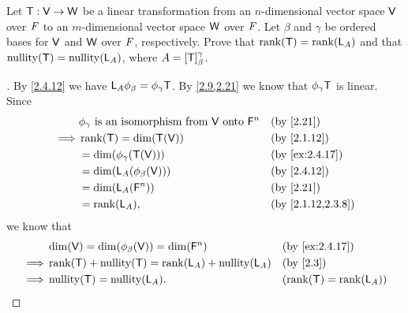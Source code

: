 \setcounter{ex}{19}
\begin{ex}\label{ex:2.4.20}
  Let \(\mathsf{T} : \mathsf{V} \to \mathsf{W}\) be a linear transformation from an \(n\)-dimensional vector space \(\mathsf{V}\) over \(\mathit{F}\) to an \(m\)-dimensional vector space \(\mathsf{W}\) over \(\mathit{F}\).
  Let \(\beta\) and \(\gamma\) be ordered bases for \(\mathsf{V}\) and \(\mathsf{W}\) over \(\mathit{F}\), respectively.
  Prove that \(\rk{\T} = \rk{\L_A}\) and that \(\nt{\T} = \nt{\L_A}\), where \(A = [\mathsf{T}]_{\beta}^{\gamma}\).
\end{ex}

\begin{proof}[]
  By \cref{2.4.12} we have \(\mathsf{L}_A \phi_{\beta} = \phi_{\gamma} \mathsf{T}\).
  By \cref{2.9,2.21} we know that \(\phi_{\gamma} \mathsf{T}\) is linear.
  Since
  \begin{align*}
             & \phi_{\gamma} \text{ is an isomorphism from } \V \text{ onto } \vs{F}^n &  & \text{(by \cref{2.21})}         \\
    \implies & \rk{\T} = \dim(\T(\V))                                                  &  & \text{(by \cref{2.1.12})}       \\
             & = \dim(\phi_{\gamma}(\T(\V)))                                           &  & \text{(by \cref{ex:2.4.17})}    \\
             & = \dim(\L_A(\phi_{\beta}(\V)))                                          &  & \text{(by \cref{2.4.12})}       \\
             & = \dim(\L_A(\vs{F}^n))                                                  &  & \text{(by \cref{2.21})}         \\
             & = \rk{\L_A},                                                            &  & \text{(by \cref{2.1.12,2.3.8})}
  \end{align*}
  we know that
  \begin{align*}
             & \dim(\V) = \dim(\phi_{\beta}(\V)) = \dim(\vs{F}^n) &  & \text{(by \cref{ex:2.4.17})} \\
    \implies & \rk{\T} + \nt{\T} = \rk{\L_A} + \nt{\L_A}          &  & \text{(by \cref{2.3})}       \\
    \implies & \nt{\T} = \nt{\L_A}.                               &  & (\rk{\T} = \rk{\L_A})
  \end{align*}
\end{proof}
